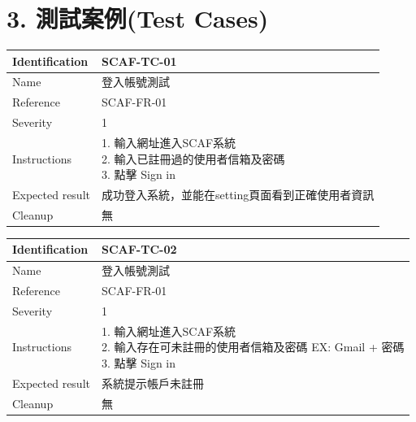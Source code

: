 \documentclass{report}
\begin{document}
\section*{3. 測試案例(Test Cases)}
\begin{tabularx}{\textwidth}{
  |p{}%
  |p{}|%
  }
  \hline
  \centering Identification &  SCAF-TC-01 \\
  \hline
  \centering Name & 登入帳號測試 \\
  \hline
  \centering Reference & SCAF-FR-01 \\
  \hline
  \centering Severity & 1 \\
  \hline
  \centering Instructions & 
  \makecell[l]{
    1. 輸入網址進入SCAF系統 \\
    2. 輸入已註冊過的使用者信箱及密碼 \\
    3. 點擊 Sign in
  }\\
  \hline
  \centering Expected result & 成功登入系統，並能在setting頁面看到正確使用者資訊 \\
  \hline
  \centering Cleanup & 無 \\
  \hline
\end{tabularx}
\newline\newline
\begin{tabularx}{\textwidth}{
  |p{}%
  |p{}|%
  }
  \hline
  \centering Identification &  SCAF-TC-02 \\
  \hline
  \centering Name & 登入帳號測試 \\
  \hline
  \centering Reference & SCAF-FR-01 \\
  \hline
  \centering Severity & 1 \\
  \hline
  \centering Instructions & 
  \makecell[l]{
    1. 輸入網址進入SCAF系統 \\
    2. 輸入存在可未註冊的使用者信箱及密碼 EX: Gmail + 密碼 \\
    3. 點擊 Sign in
  }\\
  \hline
  \centering Expected result & 系統提示帳戶未註冊 \\
  \hline
  \centering Cleanup & 無 \\
  \hline
\end{tabularx}
\\
\newline
\\
\end{document}
